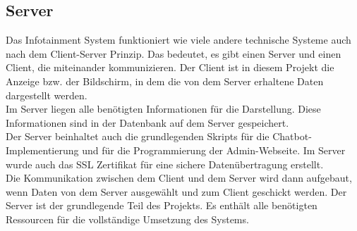 \subsection{Server}
Das Infotainment System funktioniert wie viele andere technische Systeme auch nach dem Client-Server Prinzip. Das bedeutet, es gibt einen Server und einen Client, die miteinander kommunizieren. Der Client ist in diesem Projekt die Anzeige bzw. der Bildschirm, in dem die von dem Server erhaltene Daten dargestellt werden. \\
Im Server liegen alle benötigten Informationen für die Darstellung. Diese Informationen sind in der Datenbank auf dem Server gespeichert.\\
Der Server beinhaltet auch die grundlegenden Skripts für die Chatbot-Implementierung und für die Programmierung der Admin-Webseite. Im Server wurde auch das SSL Zertifikat für eine sichere Datenübertragung erstellt.\\
Die Kommunikation zwischen dem Client und dem Server wird dann aufgebaut, wenn Daten von dem Server ausgewählt und zum Client geschickt werden. 
Der Server ist der grundlegende Teil des Projekts. Es enthält alle benötigten Ressourcen für die vollständige Umsetzung des Systems.

